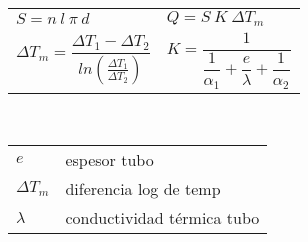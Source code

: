 \documentclass[11pt,a4paper]{article}
\begin{document}
\begin{cajita}
\begin{multicols}{2}
				\renewcommand{\arraystretch}{1.5}
				\begin{tabular}{l l}
					$S=n~l~\pi~d$ &	$Q=S~K~\Delta T_m$\\[0.2cm]
					$\Delta T_m = \dfrac {\Delta T_1 - \Delta T_2}{ln\left(\frac{\Delta T_1}{\Delta T_2}\right)}$ & $K=\dfrac{1}{\dfrac{1}{\alpha_1}+\dfrac{e}{\lambda}+\dfrac{1}{\alpha_2}}$\\
				\end{tabular}\\
				\renewcommand{\arraystretch}{1}
				\begin{tabular}{@{}p{1cm}@{}@{}p{7cm}@{}}
					$e$& espesor tubo\\
					$\Delta T_m$ & diferencia log de temp\\
					$\lambda$ & conductividad térmica tubo\\
	
				\end{tabular}
			\end{multicols}
		\end{cajita}
\end{document}
